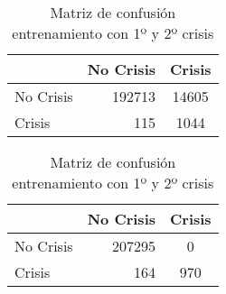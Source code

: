 \begin{table}
\begin{center}
        \begin{subtable}[c]{0.4\textwidth}
            \begin{tabular}{lrc}
                \hline
                 & No Crisis & Crisis \\
                \hline
                No Crisis & 192713 & 14605 \\
                Crisis & 115 & 1044\\
                \hline
            \end{tabular}
            \label{tab:mat-conf-raw-1.6}
        \end{subtable}
        \hspace{1em}\vspace{1em}
        \begin{subtable}[c]{0.4\textwidth}
                \begin{tabular}{lrc}
                \hline
                 & No Crisis & Crisis \\
                \hline
                No Crisis & 207295 & 0 \\
                Crisis & 164 & 970\\
                \hline
            \end{tabular}
            \label{tab:mat-conf-stats-1.6}
        \end{subtable}
        \caption{Matriz de confusión entrenamiento con 1º y 2º crisis}
        \label{tab:matriz-conf-1a-2d}
    \end{center}
\end{table}

